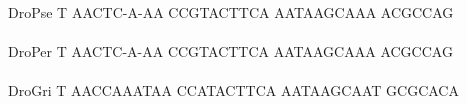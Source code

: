 \documentclass[11pt,twoside,reqno,a4paper]{article}
\begin{document}
{DroPse	T	AACTC-A-AA	CCGTACTTCA	AATAAGCAAA	ACGCCAG\\
\hspace*{7\charwidth}\hspace*{1\charwidth}\hspace*{1\charwidth}\hspace*{1\charwidth}\hspace*{1\charwidth}\\
DroPer	T	AACTC-A-AA	CCGTACTTCA	AATAAGCAAA	ACGCCAG\\
\hspace*{7\charwidth}\hspace*{1\charwidth}\hspace*{1\charwidth}\hspace*{1\charwidth}\hspace*{1\charwidth}\\
DroGri	T	AACCAAATAA	CCATACTTCA	AATAAGCAAT	GCGCACA\\
\hspace*{7\charwidth}\hspace*{1\charwidth}\hspace*{1\charwidth}\hspace*{1\charwidth}\hspace*{1\charwidth}\\
\\
}
\end{document}
